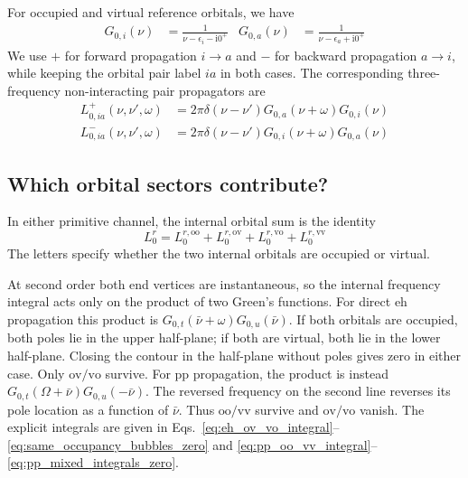 \documentclass[aip,jcp,reprint,noshowkeys,superscriptaddress]{revtex4-1}
\newcommand{\eps}{\epsilon}
\newcommand{\ii}{\mathrm{i}}
\newcommand{\eh}{\text{eh}}
\newcommand{\pp}{\text{pp}}
\begin{document}
For occupied and virtual reference orbitals, we have
\begin{align}
	G_{0,i}(\nu)
	&=
	\frac{1}{\nu-\eps_i-\ii0^+}
	&
	G_{0,a}(\nu)
	&=
	\frac{1}{\nu-\eps_a+\ii0^+}
	\label{eq:G0}
\end{align}
We use $+$ for forward propagation $i\to a$ and $-$ for backward propagation
$a\to i$, while keeping the orbital pair label $ia$ in both cases.
The corresponding three-frequency non-interacting pair propagators are
\begin{align}
	L_{0,ia}^{+}(\nu,\nu',\omega)
	&=
	2\pi\delta(\nu-\nu')
	G_{0,a}(\nu+\omega) G_{0,i}(\nu)
	\label{eq:L0_three_frequency_plus}
	\\
	L_{0,ia}^{-}(\nu,\nu',\omega)
	&=
	2\pi\delta(\nu-\nu')
	G_{0,i}(\nu+\omega)G_{0,a}(\nu)
	\label{eq:L0_three_frequency_minus}
\end{align}


\subsection{Which orbital sectors contribute?}
\label{sec:orbital_sectors_explanation}

In either primitive channel, the internal orbital sum is the identity
\begin{equation}
    L_0^r=L_0^{r,\text{oo}}+L_0^{r,\text{ov}}
    +L_0^{r,\text{vo}}+L_0^{r,\text{vv}}
    \label{eq:L0_all_sectors_main}
\end{equation}
The letters specify whether the two internal orbitals are occupied or
virtual. 

At second order both end vertices are instantaneous, so the internal
frequency integral acts only on the product of two Green's functions.
For direct $\eh$ propagation this product is
$G_{0,t}(\bar\nu+\omega)G_{0,u}(\bar\nu)$.
If both orbitals are occupied, both poles lie in the upper half-plane;
if both are virtual, both lie in the lower half-plane.
Closing the contour in the half-plane without poles gives zero in either
case. Only $\text{ov}/\text{vo}$ survive.
For $\pp$ propagation, the product is instead
$G_{0,t}(\Omega+\bar\nu)G_{0,u}(-\bar\nu)$.
The reversed frequency on the second line reverses its pole location
as a function of $\bar\nu$. Thus $\text{oo}/\text{vv}$ survive and
$\text{ov}/\text{vo}$ vanish.
The explicit integrals are given in
Eqs.~\eqref{eq:eh_ov_vo_integral}--\eqref{eq:same_occupancy_bubbles_zero}
and \eqref{eq:pp_oo_vv_integral}--\eqref{eq:pp_mixed_integrals_zero}.
\end{document}
